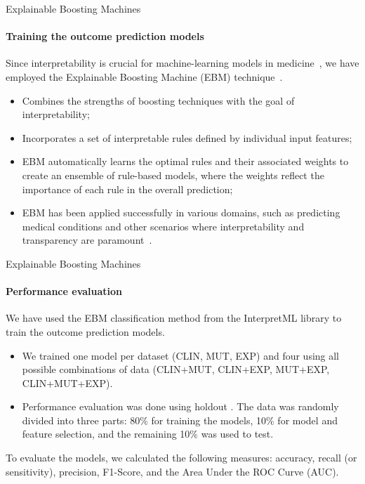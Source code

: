 \begin{frame}{Explainable Boosting Machines}
\framesubtitle{Training the outcome prediction models}

Since interpretability is crucial for machine-learning models in medicine~\cite{Combi-2022}, we have employed the Explainable Boosting Machine (EBM) technique~\cite{Caruana-2015}.


\begin{itemize}
    \item Combines the strengths of boosting techniques with the goal of interpretability;
    \item Incorporates a set of interpretable rules defined by individual input features;
    \item EBM automatically learns the optimal rules and their associated weights to create an ensemble of rule-based models, where the weights reflect the importance of each rule in the overall prediction;
    \item EBM has been applied successfully in various domains, such as predicting medical conditions and other scenarios where interpretability and transparency are paramount~\cite{pmlr-v139-nori21a}.
\end{itemize}

\end{frame}


\begin{frame}{Explainable Boosting Machines}
\framesubtitle{Performance evaluation}

We have used the EBM classification method from the InterpretML library to train the outcome prediction models.

\begin{itemize}
    \item We trained one model per dataset (CLIN, MUT, EXP) and four using all possible combinations of data (CLIN+MUT, CLIN+EXP, MUT+EXP, CLIN+MUT+EXP).
    \item  Performance evaluation was done using holdout \cite{Mitchell-1997}. The data was randomly divided into three parts:  80\% for training the models, 10\%  for model and feature selection, and the remaining 10\% was used to test.
\end{itemize}

To evaluate the models, we calculated the following measures: accuracy, recall (or sensitivity), precision, F1-Score, and the Area Under the ROC Curve (AUC).
    
\end{frame}